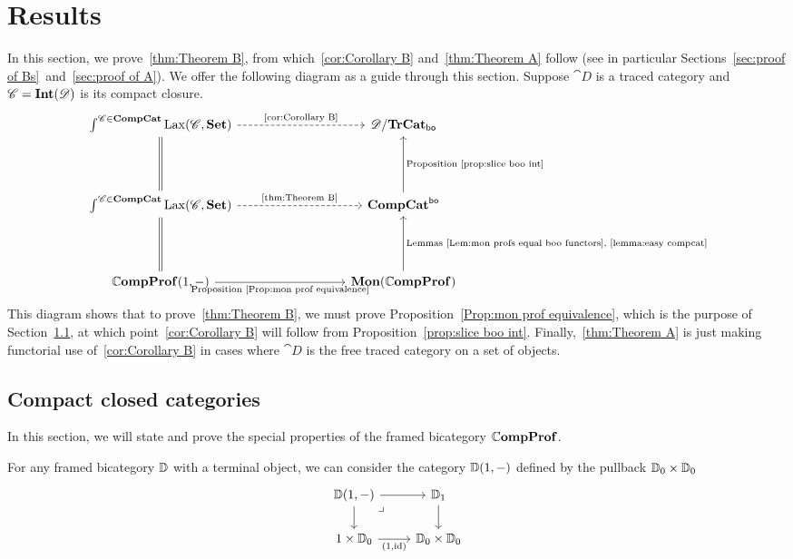 \documentclass[12pt,oneside,article,draft]{memoir}
\begin{document}
\chapter{Results}\label{sec:generalization}

In this section, we prove~\ref{thm:Theorem B}, from which~\ref{cor:Corollary B} and~\ref{thm:Theorem A} follow (see in particular Sections~\ref{sec:proof of Bs}~and~\ref{sec:proof of A}).
We offer the following diagram as a guide through this section.
Suppose $\cat{D}$ is a traced category and $\mathscr{C}=\mathbf{Int}(\mathscr{D})$ is its compact closure.
\[
\begin{tikzcd}[column sep=3cm,row sep=1.5cm]
   \int^{\cat{C}\in\CompCat}\Lax(\cat{C},\Set) \ar[r,dashed,"\tn{\ref{cor:Corollary B}}"]\ar[d,equal]
      & \cat{D}/\TrCat_{\bo} \\
   \int^{\cat{C}\in\CompCat}\Lax(\cat{C},\Set) \ar[r,dashed,"\tn{\ref{thm:Theorem B}}"]\ar[d,equal]
      & \CompCat^{\bo} \ar[u,"\tn{Proposition~\ref{prop:slice boo int}}"'] \\
   \dCompProf(1,-) \ar[r,"\tn{Proposition~\ref{Prop:mon prof equivalence}}"']
      & \Mon(\dCompProf) \ar[u,"\tn{Lemmas~\ref{Lem:mon profs equal boo functors},\ \ref{lemma:easy compcat}}"']
\end{tikzcd}
\]
This diagram shows that to prove~\ref{thm:Theorem B}, we must prove Proposition~\ref{Prop:mon prof equivalence}, which is the purpose of Section~\ref{sec:ccc's}, at which point~\ref{cor:Corollary B} will follow from Proposition~\ref{prop:slice boo int}.
Finally,~\ref{thm:Theorem A} is just making functorial use of~\ref{cor:Corollary B} in cases where $\cat{D}$ is the free traced category on a set of objects.


\section{Compact closed categories}\label{sec:ccc's}

In this section, we will state and prove the special properties of the framed bicategory $\mathbb{C}\mathbf{ompProf}$.

For any framed bicategory $\mathbb{D}$ with a terminal object, we can consider the category $\mathbb{D}(1,-)$ defined by the pullback $\mathbb{D}_0\times\mathbb{D}_0$
\begin{equation}
   \begin{tikzcd}
      \dcat{D}(1,-) \ar[r] \ar[d] \arrow[dr,phantom,"\lrcorner",very near start]
         & \dcat{D}_1 \ar[d] \\
      1\times\dcat{D}_0 \ar[r,"{(1,\id)}"']
         & \dcat{D}_0\times\dcat{D}_0
   \end{tikzcd}
\end{equation}
\end{document}
